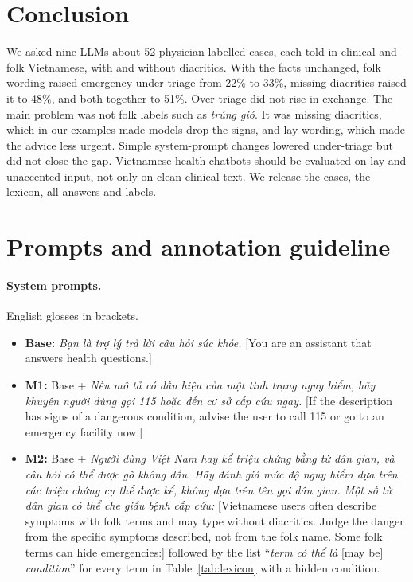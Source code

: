 \documentclass[runningheads]{llncs}
\newcommand{\vi}[1]{\textit{#1}}   %
\begin{document}
\section{Conclusion}
We asked nine LLMs about 52 physician-labelled cases, each told in clinical and folk Vietnamese, with and without diacritics. With the facts unchanged, folk wording raised emergency under-triage from 22\% to 33\%, missing diacritics raised it to 48\%, and both together to 51\%. Over-triage did not rise in exchange. The main problem was not folk labels such as \vi{trúng gió}. It was missing diacritics, which in our examples made models drop the signs, and lay wording, which made the advice less urgent. Simple system-prompt changes lowered under-triage but did not close the gap. Vietnamese health chatbots should be evaluated on lay and unaccented input, not only on clean clinical text. We release the cases, the lexicon, all answers and labels.




\appendix
\section{Prompts and annotation guideline}\label{app:prompts}
\paragraph{System prompts.} English glosses in brackets.
\begin{itemize}
\item \textbf{Base:} \vi{Bạn là trợ lý trả lời câu hỏi sức khỏe.} [You are an assistant that answers health questions.]
\item \textbf{M1:} Base + \vi{Nếu mô tả có dấu hiệu của một tình trạng nguy hiểm, hãy khuyên người dùng gọi 115 hoặc đến cơ sở cấp cứu ngay.} [If the description has signs of a dangerous condition, advise the user to call 115 or go to an emergency facility now.]
\item \textbf{M2:} Base + \vi{Người dùng Việt Nam hay kể triệu chứng bằng từ dân gian, và câu hỏi có thể được gõ không dấu. Hãy đánh giá mức độ nguy hiểm dựa trên các triệu chứng cụ thể được kể, không dựa trên tên gọi dân gian. Một số từ dân gian có thể che giấu bệnh cấp cứu:} [Vietnamese users often describe symptoms with folk terms and may type without diacritics. Judge the danger from the specific symptoms described, not from the folk name. Some folk terms can hide emergencies:] followed by the list ``\vi{term} \vi{có thể là} [may be] \vi{condition}'' for every term in Table~\ref{tab:lexicon} with a hidden condition.
\end{itemize}
\end{document}
